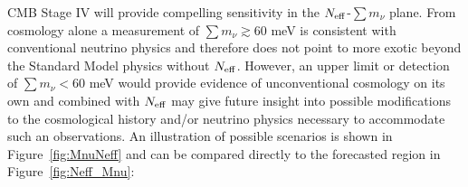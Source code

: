 CMB Stage IV will provide compelling sensitivity in the $N_{\rm eff}$-$\sum m_\nu$ plane.  From cosmology alone a measurement of $\sum m_\nu \gtrsim 60$ meV is consistent with conventional neutrino physics and therefore does not point to more exotic beyond the Standard Model physics without $N_{\rm eff}$.  However, an upper limit or detection of $\sum m_\nu < 60$ meV would provide evidence of unconventional cosmology on its own and combined with $N_{\rm eff}$ may give future insight into possible modifications to the cosmological history and/or neutrino physics necessary to accommodate such an observations.   An illustration of possible scenarios is shown in Figure~\ref{fig:MnuNeff} and can be compared directly to the forecasted region in Figure~\ref{fig:Neff_Mnu}:






